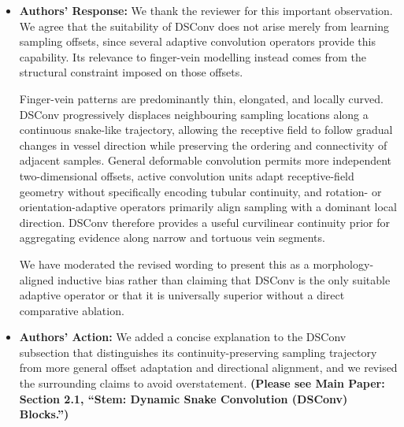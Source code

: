 \documentclass[11pt]{article}
\theoremstyle{remark}
\begin{document}
\begin{itemize}
    \item \textbf{Authors' Response:}
    We thank the reviewer for this important observation. We agree that the suitability of DSConv does not arise merely from learning sampling offsets, since several adaptive convolution operators provide this capability. Its relevance to finger-vein modelling instead comes from the structural constraint imposed on those offsets.

    Finger-vein patterns are predominantly thin, elongated, and locally curved. DSConv progressively displaces neighbouring sampling locations along a continuous snake-like trajectory, allowing the receptive field to follow gradual changes in vessel direction while preserving the ordering and connectivity of adjacent samples. General deformable convolution permits more independent two-dimensional offsets, active convolution units adapt receptive-field geometry without specifically encoding tubular continuity, and rotation- or orientation-adaptive operators primarily align sampling with a dominant local direction. DSConv therefore provides a useful curvilinear continuity prior for aggregating evidence along narrow and tortuous vein segments.

    We have moderated the revised wording to present this as a morphology-aligned inductive bias rather than claiming that DSConv is the only suitable adaptive operator or that it is universally superior without a direct comparative ablation.

    \item \textbf{Authors' Action:}
    We added a concise explanation to the DSConv subsection that distinguishes its continuity-preserving sampling trajectory from more general offset adaptation and directional alignment, and we revised the surrounding claims to avoid overstatement. \textbf{(Please see Main Paper: Section 2.1, ``Stem: Dynamic Snake Convolution (DSConv) Blocks.'')}
\end{itemize}


\end{document}
